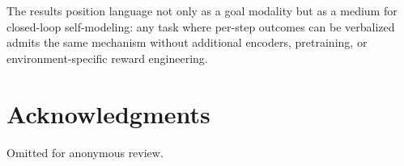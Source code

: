 \documentclass[letterpaper]{article} %
\begin{document}
The results position language not only as a goal modality but as a medium for closed-loop self-modeling: any task where per-step outcomes can be verbalized admits the same mechanism without additional encoders, pretraining, or environment-specific reward engineering.

\section*{Acknowledgments}
Omitted for anonymous review.

\clearpage

\end{document}
